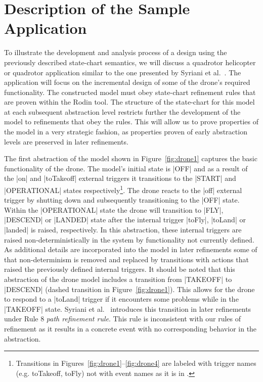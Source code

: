 \section{Description of the Sample Application}
\label{sec:descr-sample-appl}

To illustrate the development and analysis process of a design using the previously described 
state-chart semantics, we will discuss a quadrotor helicopter or quadrotor application similar to 
the one presented by Syriani et al.~\cite{Syriani_2019}. The application will focus on the incremental 
design of some of the drone's required functionality.
The constructed model must obey state-chart refinement rules that are proven within the Rodin tool.
The structure of the state-chart for this model at each subsequent abstraction level restricts further the
development of the model to refinements that obey the rules. This will allow us to prove properties 
of the model in a very strategic fashion, as properties proven of early abstraction levels 
are preserved in later refinements.

The first abstraction of the model shown in Figure~\ref{fig:drone1} captures the basic 
functionality of the drone. The model's initial state is |OFF| and as a result of the |on| and 
|toTakeoff| external triggers it transitions to the |START| and |OPERATIONAL| states 
respectively\footnote{Transitions in Figures~\ref{fig:drone1}--\ref{fig:drone4} are labeled with trigger names
(e.g. toTakeoff, toFly) not with event names as it is in \UMLB.}. 
The drone reacts to the |off| external trigger by shutting down and subsequently transitioning to the |OFF| state.
Within the |OPERATIONAL| state the drone will transition to |FLY|, |DESCEND| or |LANDED| 
state after the internal trigger |toFly|, |toLand| or |landed| is raised, respectively. 
In this abstraction, these internal triggers are raised non-deterministically 
in the system by functionality not currently defined.
As additional details are incorporated into the model in later refinements some of that non-determinism is 
removed and replaced by transitions with actions that raised the previously defined internal triggers.
It should be noted that this abstraction of the drone model includes a transition 
from |TAKEOFF| to |DESCEND| (dashed transition in Figure~\ref{fig:drone1}). 
This allows for the drone to respond to a |toLand| trigger if it encounters some 
problems while in the |TAKEOFF| state. Syriani et al.~\cite{Syriani_2019} introduces this transition 
in later refinements under Rule 8 \emph{path refinement rule}. This rule is inconsistent with our rules 
of refinement as it results in a concrete event with no corresponding 
behavior in the abstraction.

